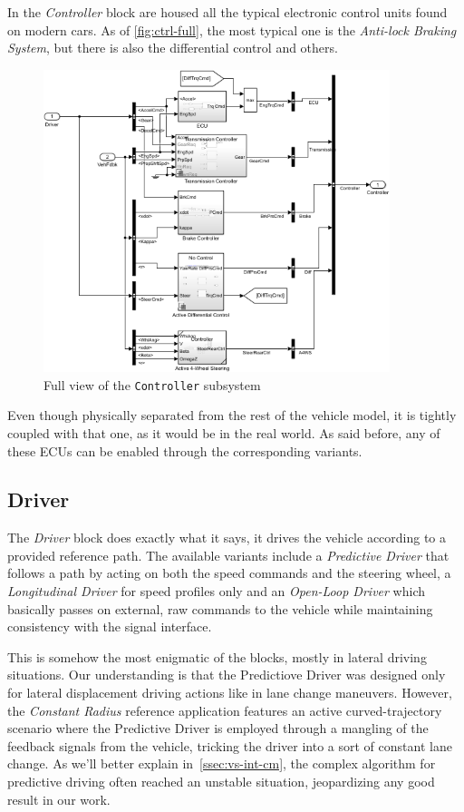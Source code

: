 		In the \emph{Controller} block are housed all the typical electronic control units found on modern cars. As of \vref{fig:ctrl-full}, the most typical one is the
		\emph{Anti-lock Braking System}, but there is also the differential control and others.
		\begin{figure}[hbt]
			\centering
			\includegraphics[width=0.9\textwidth]{Images/Simulator/ctrl-full}
			\caption{Full view of the \lstinline{Controller} subsystem}
			\label{fig:ctrl-full}
		\end{figure}

		Even though physically separated from the rest of the vehicle model, it is tightly coupled with that one, as it would be in the real world. As said before, any of these ECUs
		can be enabled through the corresponding variants.

		\subsection{Driver}
		\label{ssec:vs-env-drv}

		The \emph{Driver} block does exactly what it says, it drives the vehicle according to a provided reference path.
		The available variants include a \emph{Predictive Driver} that follows a path by acting on both the speed commands and the steering wheel,
		a \emph{Longitudinal Driver} for speed profiles only and an \emph{Open-Loop Driver} which basically passes on external, raw commands to the vehicle
		while maintaining consistency with the signal interface.

		This is somehow the most enigmatic of the blocks, mostly in lateral driving situations. Our understanding is that the Predictiove Driver was designed only for
		lateral displacement driving actions like in lane change maneuvers. However, the \emph{Constant Radius} reference application features an active curved-trajectory
		scenario where the Predictive Driver is employed through a mangling of the feedback signals from the vehicle, tricking the driver into a sort of constant lane change. As
		we'll better explain in~\vref{ssec:vs-int-cm}, the complex algorithm for predictive driving often reached an unstable situation, jeopardizing any good result in our work.



